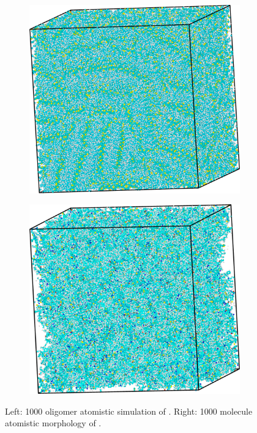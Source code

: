\begin{figure}
\centering
\begin{subfigure}{.5\textwidth}
    \includegraphics[width=\textwidth]{figures/consistent-color-p3ht.png}
\end{subfigure}%
\begin{subfigure}{.5\textwidth}
    \includegraphics[width=\textwidth]{figures/consistent-color-itic.png}
\end{subfigure}
\caption{Left: 1000 oligomer atomistic simulation
    of . Right: 1000 molecule atomistic morphology of .}
\label{ITIC/P3HT}
\end{figure}

